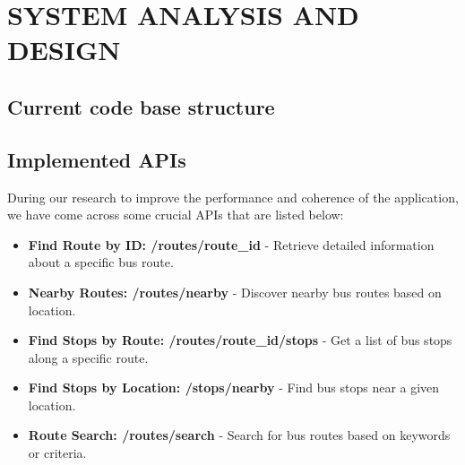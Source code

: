 \section{SYSTEM ANALYSIS AND DESIGN}

\subsection{Current code base structure}

\subsection{Implemented APIs}

During our research to improve the performance and coherence of the application, we have come across some crucial APIs that are listed below:
\begin{itemize}
    \item \textbf{Find Route by ID: /routes/route\_id} - Retrieve detailed information about a specific bus route.
    \item \textbf{Nearby Routes: /routes/nearby} - Discover nearby bus routes based on location.
    \item \textbf{Find Stops by Route: /routes/route\_id/stops} - Get a list of bus stops along a specific route.
    \item \textbf{Find Stops by Location: /stops/nearby} - Find bus stops near a given location.
    \item \textbf{Route Search: /routes/search} - Search for bus routes based on keywords or criteria.
\end{itemize}
